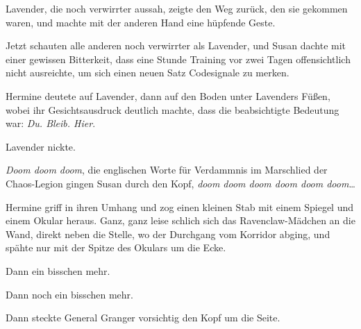Lavender, die noch verwirrter aussah, zeigte den Weg zurück, den sie gekommen waren, und machte mit der anderen Hand eine hüpfende Geste.

Jetzt schauten alle anderen noch verwirrter als Lavender, und Susan dachte mit einer gewissen Bitterkeit, dass eine Stunde Training vor zwei Tagen offensichtlich nicht ausreichte, um sich einen neuen Satz Codesignale zu merken.

Hermine deutete auf Lavender, dann auf den Boden unter Lavenders Füßen, wobei ihr Gesichtsausdruck deutlich machte, dass die beabsichtigte Bedeutung war: \emph{Du. Bleib. Hier}.

Lavender nickte.

\emph{Doom doom doom}, die englischen Worte für Verdammnis im Marschlied der Chaos-Legion gingen Susan durch den Kopf, \emph{doom doom doom doom doom doom}…

Hermine griff in ihren Umhang und zog einen kleinen Stab mit einem Spiegel und einem Okular heraus. Ganz, ganz leise schlich sich das Ravenclaw-Mädchen an die Wand, direkt neben die Stelle, wo der Durchgang vom Korridor abging, und spähte nur mit der Spitze des Okulars um die Ecke.

Dann ein bisschen mehr.

Dann noch ein bisschen mehr.

Dann steckte General Granger vorsichtig den Kopf um die Seite.

